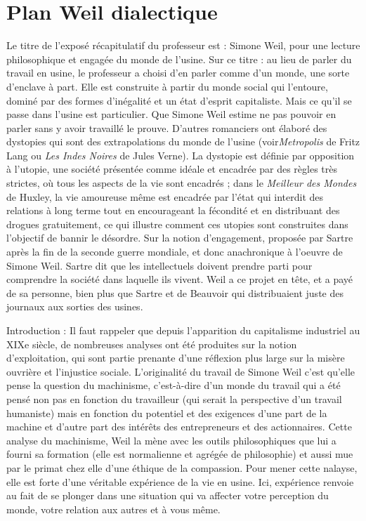 \documentclass[a4paper,12pt]{book}
\begin{document}
\section{Plan Weil dialectique}
Le titre de l'exposé récapitulatif du professeur est : Simone Weil, pour une lecture philosophique et engagée du monde de l'usine. Sur ce titre : au lieu de parler du travail en usine, le professeur a choisi d'en parler comme d'un monde, une sorte d'enclave à part. Elle est construite à partir du monde social qui l'entoure, dominé par des formes d'inégalité et un état d'esprit capitaliste. Mais ce qu'il se passe dans l'usine est particulier. Que Simone Weil estime ne pas pouvoir en parler sans y avoir travaillé le prouve. D'autres romanciers ont élaboré des dystopies qui sont des extrapolations du monde de l'usine (voir\textit{Metropolis} de Fritz Lang ou \textit{Les Indes Noires} de Jules Verne). La dystopie est définie par opposition à l'utopie, une société présentée comme idéale et encadrée par des règles très strictes, où tous les aspects de la vie sont encadrés ; dans le \textit{Meilleur des Mondes} de Huxley, la vie amoureuse même est encadrée par l'état qui interdit des relations à long terme tout en encourageant la fécondité et en distribuant des drogues gratuitement, ce qui illustre comment ces utopies sont construites dans l'objectif de bannir le désordre. Sur la notion d'engagement, proposée par Sartre après la fin de la seconde guerre mondiale, et donc anachronique à l'oeuvre de Simone Weil. Sartre dit que les intellectuels doivent prendre parti pour comprendre la société dans laquelle ils vivent. Weil a ce projet en tête, et a payé de sa personne, bien plus que Sartre et de Beauvoir qui distribuaient juste des journaux aux sorties des usines.
\par Introduction : Il faut rappeler que depuis l'apparition du capitalisme industriel au XIXe siècle, de nombreuses analyses ont été produites sur la notion d'exploitation, qui sont partie prenante d'une réflexion plus large sur la misère ouvrière et l'injustice sociale. L'originalité du travail de Simone Weil c'est qu'elle pense la question du machinisme, c'est-à-dire d'un monde du travail qui a été pensé non pas en fonction du travailleur (qui serait la perspective d'un travail humaniste) mais en fonction du potentiel et des exigences d'une part de la machine et d'autre part des intérêts des entrepreneurs et des actionnaires. Cette analyse du machinisme, Weil la mène avec les outils philosophiques que lui a fourni sa formation (elle est normalienne et agrégée de philosophie) et aussi mue par le primat chez elle d'une éthique de la compassion. Pour mener cette nalayse, elle est forte d'une véritable expérience de la vie en usine. Ici, expérience renvoie au fait de se plonger dans une situation qui va affecter votre perception du monde, votre relation aux autres et à vous même.
\end{document}
